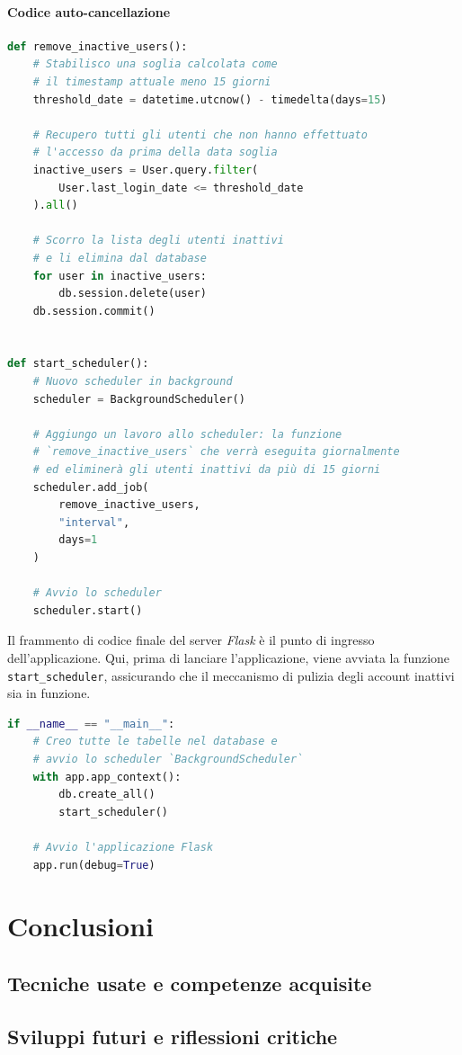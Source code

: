 \documentclass[12pt]{report}
\newcommand{\flask}{\textsl{Flask}\xspace}
\begin{document}
\subsubsection{Codice auto-cancellazione}
\begin{lstlisting}[language=Python]
def remove_inactive_users():
    # Stabilisco una soglia calcolata come
    # il timestamp attuale meno 15 giorni
    threshold_date = datetime.utcnow() - timedelta(days=15)

    # Recupero tutti gli utenti che non hanno effettuato
    # l'accesso da prima della data soglia
    inactive_users = User.query.filter(
        User.last_login_date <= threshold_date
    ).all()

    # Scorro la lista degli utenti inattivi
    # e li elimina dal database
    for user in inactive_users:
        db.session.delete(user)
    db.session.commit()


def start_scheduler():
    # Nuovo scheduler in background
    scheduler = BackgroundScheduler()

    # Aggiungo un lavoro allo scheduler: la funzione
    # `remove_inactive_users` che verrà eseguita giornalmente
    # ed eliminerà gli utenti inattivi da più di 15 giorni
    scheduler.add_job(
        remove_inactive_users,
        "interval",
        days=1
    )

    # Avvio lo scheduler
    scheduler.start()
\end{lstlisting}


\begin{mdframed}
\small
Il frammento di codice finale del server \flask è il punto di ingresso dell'applicazione. Qui, prima di lanciare l'applicazione, viene avviata la funzione \texttt{start\_scheduler}, assicurando che il meccanismo di pulizia degli account inattivi sia in funzione.

\begin{lstlisting}[language=Python]
if __name__ == "__main__":
    # Creo tutte le tabelle nel database e
    # avvio lo scheduler `BackgroundScheduler`
    with app.app_context():
        db.create_all()
        start_scheduler()

    # Avvio l'applicazione Flask
    app.run(debug=True)
\end{lstlisting}
\end{mdframed}


\chapter{Conclusioni}
\label{sec:conclusioni}
\section{Tecniche usate e competenze acquisite}
\section{Sviluppi futuri e riflessioni critiche}
\end{document}
